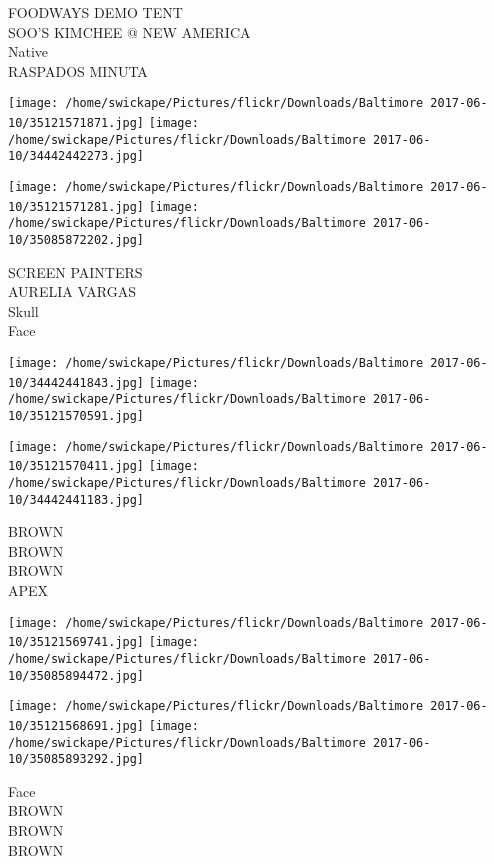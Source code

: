 \documentclass[10pt,letterpaper]{article}
\begin{document}
FOODWAYS DEMO TENT\\
SOO'S KIMCHEE @ NEW AMERICA\\
Native\\
RASPADOS MINUTA\\
\pagebreak

\texttt{[image: /home/swickape/Pictures/flickr/Downloads/Baltimore 2017-06-10/35121571871.jpg]}
\texttt{[image: /home/swickape/Pictures/flickr/Downloads/Baltimore 2017-06-10/34442442273.jpg]}

\texttt{[image: /home/swickape/Pictures/flickr/Downloads/Baltimore 2017-06-10/35121571281.jpg]}
\texttt{[image: /home/swickape/Pictures/flickr/Downloads/Baltimore 2017-06-10/35085872202.jpg]}

SCREEN PAINTERS\\
AURELIA VARGAS\\
Skull\\
Face\\
\pagebreak

\texttt{[image: /home/swickape/Pictures/flickr/Downloads/Baltimore 2017-06-10/34442441843.jpg]}
\texttt{[image: /home/swickape/Pictures/flickr/Downloads/Baltimore 2017-06-10/35121570591.jpg]}

\texttt{[image: /home/swickape/Pictures/flickr/Downloads/Baltimore 2017-06-10/35121570411.jpg]}
\texttt{[image: /home/swickape/Pictures/flickr/Downloads/Baltimore 2017-06-10/34442441183.jpg]}

BROWN\\
BROWN\\
BROWN\\
APEX\\
\pagebreak

\texttt{[image: /home/swickape/Pictures/flickr/Downloads/Baltimore 2017-06-10/35121569741.jpg]}
\texttt{[image: /home/swickape/Pictures/flickr/Downloads/Baltimore 2017-06-10/35085894472.jpg]}

\texttt{[image: /home/swickape/Pictures/flickr/Downloads/Baltimore 2017-06-10/35121568691.jpg]}
\texttt{[image: /home/swickape/Pictures/flickr/Downloads/Baltimore 2017-06-10/35085893292.jpg]}

Face\\
BROWN\\
BROWN\\
BROWN\\
\pagebreak
\end{document}
